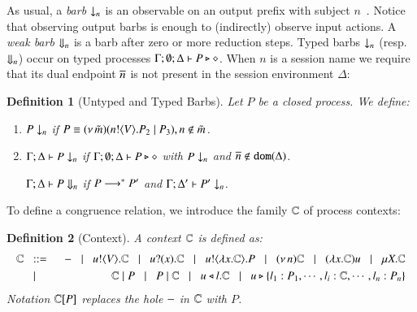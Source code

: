 \documentclass[preprint,11pt]{elsarticle}
\newtheorem{definition}{Definition}[section]
\begin{document}
{%

As usual, a \emph{barb} $\downarrow_{n}$ is an observable on an output prefix with subject $n$~\cite{MiSa92}.
Notice that observing output barbs is enough to (indirectly) observe input actions.
A \emph{weak barb} $\Downarrow_{n}$ is a barb after zero or more reduction steps.
Typed barbs $\downarrow_{n}$ (resp.\ $\Downarrow_{n}$)
occur on typed processes $\Gamma; \emptyset; \Delta \vdash P \triangleright \diamond$.
When $n$ is a session name we require that its dual endpoint $\overline{n}$ is not present
in the session environment $\Delta$:

\begin{definition}[Untyped and Typed Barbs]\label{d:barb}%
	Let $P$ be a closed process. We define:
	\begin{enumerate}[1.]
		\item	
		$P \downarrow_{n}$ if $P \equiv (\nu\, \tilde{m})(n ! \langle V \rangle . P_2 \;|\; P_3), n \notin \tilde{m}$. %

		\item	$\Gamma; \Delta \vdash P \downarrow_{n}$ if
			$\Gamma; \emptyset; \Delta \vdash P \triangleright \diamond$ with $P \downarrow_{n}$ and $\overline{n} \notin \mathtt{dom}(\Delta)$.

			$\Gamma; \Delta \vdash P \Downarrow_{n}$ if $P \longrightarrow^* P'$ and
			$\Gamma; \Delta' \vdash P' \downarrow_{n}$.			
	\end{enumerate}
\end{definition}



To define a congruence relation, we introduce the family ${\mathbb{C}}$ of process contexts:

\begin{definition}[Context]
	A context ${\mathbb{C}}$ is defined as:
\begin{eqnarray*}
		{\mathbb{C}} & \;\;::=\;\; &  - \;\;\;|\;\;\; u ! \langle V \rangle . {\mathbb{C}} \;\;\;|\;\;\; u ? (x) . {\mathbb{C}} \;\;\;|\;\;\; u ! \langle \lambda x.{\mathbb{C}} \rangle . P \;\;\;|\;\;\; (\nu\, n) {\mathbb{C}}
		\;\;\;|\;\;\; (\lambda x.{\mathbb{C}})u \;\;\;|\;\;\; \mu X. {\mathbb{C}}  
		\\
		& \;\;\;|\;\;\; &  {\mathbb{C}} \;|\; P \;\;\;|\;\;\; P \;|\; {\mathbb{C}} \;\;\;|\;\;\; u \triangleleft l . {\mathbb{C}} \;\;\;|\;\;\; u \triangleright \{l_1:P_1,\cdots,l_i:{\mathbb{C}},\cdots,l_n:P_n\} 
	\end{eqnarray*}
Notation ${\mathbb{C}}[P]$ replaces 
the hole $-$ in ${\mathbb{C}}$ with $P$.
\end{definition}

}
\end{document}

